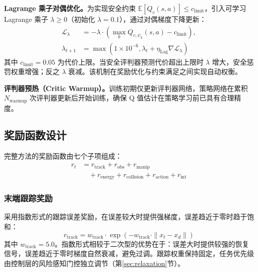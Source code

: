 \documentclass[10pt,conference]{IEEEtran}
\begin{document}
\textbf{Lagrange 乘子对偶优化。}为实现安全约束 $\mathbb{E}[Q_c(s,a)] \leq c_{\text{limit}}$，引入可学习 Lagrange 乘子 $\lambda \geq 0$（初始化 $\lambda=0.1$），通过对偶梯度下降更新：
\begin{equation}
\begin{aligned}
\mathcal{L}_{\lambda} &= -\lambda \cdot \left( \max_k Q_{c,\psi_k}(s, a) - c_{\text{limit}} \right), \\
\lambda_{t+1} &= \max(1 \times 10^{-6}, \lambda_t + \eta_{\text{Lag}} \nabla \mathcal{L}_{\lambda})
\end{aligned}
\label{eq:lag_loss}
\end{equation}
其中 $c_{\text{limit}}=0.05$ 为代价上限。当安全评判器预测代价超出上限时 $\lambda$ 增大，安全惩罚权重增强；反之 $\lambda$ 衰减。该机制在奖励优化与约束满足之间实现自动权衡。

\textbf{评判器预热（Critic Warmup）。}训练初期仅更新评判器网络，策略网络在累积 $N_{\text{warmup}}$ 次评判器更新后开始训练，确保 Q 值估计在策略学习前已具有合理精度。

\subsection{奖励函数设计}
\label{sec:reward}

完整方法的奖励函数由七个子项组成：
\begin{equation}
\begin{aligned}
r_t &= r_{\text{track}} + r_{\text{obs}} + r_{\text{manip}} \\
&\quad + r_{\text{energy}} + r_{\text{collision}} + r_{\text{action}}+r_{\text{int}}
\end{aligned}
\label{eq:reward_total}
\end{equation}

\subsubsection{末端跟踪奖励}
采用指数形式的跟踪误差奖励，在误差较大时提供强梯度，误差趋近于零时趋于饱和：
\begin{equation}
r_{\text{track}} = w_{\text{track}} \cdot \exp\left(-w_{\text{track}} \cdot \|x_t - x_d\|\right)
\label{eq:track_reward}
\end{equation}
其中 $w_{\text{track}}=5.0$。指数形式相较于二次型的优势在于：误差大时提供较强的恢复信号，误差趋近于零时梯度自然衰减，避免过调。跟踪权重保持固定，任务优先级由控制层的风险感知门控独立调节（第\ref{sec:relaxation}节）。
\end{document}
